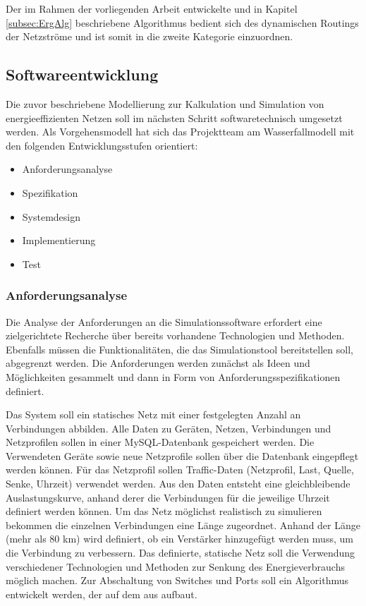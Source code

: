 Der im Rahmen der vorliegenden Arbeit entwickelte und in Kapitel \ref{subsec:ErgAlg} beschriebene Algorithmus bedient sich des dynamischen Routings der Netzströme und ist somit in die zweite Kategorie einzuordnen.

\subsection{Softwareentwicklung}\label{subsec:VorgSoftwareEng}
Die zuvor beschriebene Modellierung zur Kalkulation und Simulation von energieeffizienten Netzen soll im nächsten Schritt softwaretechnisch umgesetzt werden. Als Vorgehensmodell hat sich das Projektteam am Wasserfallmodell mit den folgenden Entwicklungsstufen orientiert:
\begin{itemize}
\item Anforderungsanalyse
\item Spezifikation
\item Systemdesign
\item Implementierung
\item Test
\end{itemize}

\subsubsection{Anforderungsanalyse}
Die Analyse der Anforderungen an die Simulationssoftware erfordert eine zielgerichtete Recherche über bereits vorhandene Technologien und Methoden. Ebenfalls müssen die Funktionalitäten, die das Simulationstool bereitstellen soll, abgegrenzt werden. Die Anforderungen werden zunächst als Ideen und Möglichkeiten gesammelt und dann in Form von Anforderungsspezifikationen definiert. 

Das System soll ein statisches Netz mit einer festgelegten Anzahl an Verbindungen abbilden. Alle Daten zu Geräten, Netzen, Verbindungen und Netzprofilen sollen in einer MySQL-Datenbank gespeichert werden. Die Verwendeten Geräte sowie neue Netzprofile sollen über die Datenbank eingepflegt werden können. Für das Netzprofil sollen Traffic-Daten (Netzprofil, Last, Quelle, Senke, Uhrzeit) verwendet werden. Aus den Daten entsteht eine gleichbleibende Auslastungskurve, anhand derer die Verbindungen für die jeweilige Uhrzeit definiert werden können. Um das Netz möglichst realistisch zu simulieren bekommen die einzelnen Verbindungen eine Länge zugeordnet. Anhand der Länge (mehr als 80 km) wird definiert, ob ein Verstärker hinzugefügt werden muss, um die Verbindung zu verbessern. Das definierte, statische Netz soll die Verwendung verschiedener Technologien und Methoden zur Senkung des Energieverbrauchs möglich machen. Zur Abschaltung von Switches und Ports soll ein Algorithmus entwickelt werden, der auf dem  aus \cite{fisher} aufbaut.

